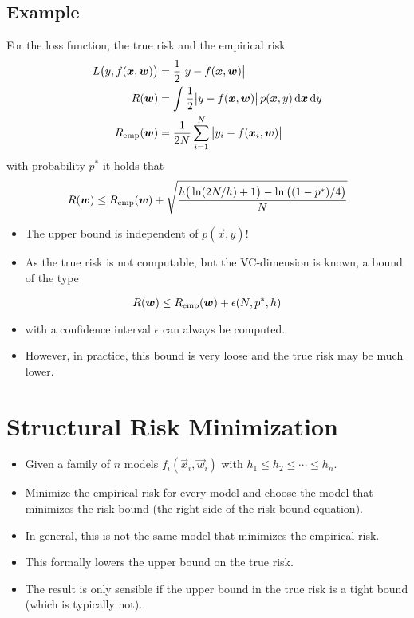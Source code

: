 		\subsection{Example}
			For the loss function, the true risk and the empirical risk
			\begin{align}
				L\big(y, f(\bm{x}, \bm{w})\big) &= \frac{1}{2} \big\lvert y - f(\bm{x}, \bm{w}) \big\rvert \\
				R(\bm{w}) &= \int \frac{1}{2} \big\lvert y - f(\bm{x}, \bm{w}) \big\rvert \, p(\bm{x}, y) \dd{\bm{x}} \dd{y} \\
				R_{\operatorname{emp}}(\bm{w}) &= \frac{1}{2N} \sum_{i = 1}^{N} \big\lvert y_i - f(\bm{x}_i, \bm{w}) \big\rvert
			\end{align}
			with probability \( p^\ast \) it holds that
			\begin{equation}
				R(\bm{w}) \leq R_{\operatorname{emp}}(\bm{w}) + \sqrt{\frac{h\big(\ln(2N / h) + 1\big) - \ln\big((1 - p^\ast) / 4\big)}{N}}
			\end{equation}
			\begin{itemize}
				\item The upper bound is independent of \( p(\vec{x}, y) \)!
				\item As the true risk is not computable, but the VC-dimension is known, a bound of the type
			\end{itemize}
			\begin{equation}
				R(\bm{w}) \leq R_{\operatorname{emp}}(\bm{w}) + \epsilon(N, p^\ast, h)
			\end{equation}
			\begin{itemize}
				\item[] with a confidence interval \(\epsilon\) can always be computed.
				\item However, in practice, this bound is very loose and the true risk may be much lower.
			\end{itemize}

	\section{Structural Risk Minimization}
		\begin{itemize}
			\item Given a family of \(n\) models \( f_i(\vec{x}_i, \vec{w}_i) \) with \( h_1 \leq h_2 \leq \cdots \leq h_n \).
			\item Minimize the empirical risk for every model and choose the model that minimizes the risk bound (the right side of the risk bound equation).
			\item In general, this is not the same model that minimizes the empirical risk.
			\item This formally lowers the upper bound on the true risk.
			\item The result is only sensible if the upper bound in the true risk is a tight bound (which is typically not).
		\end{itemize}
	
